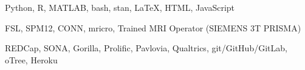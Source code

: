 	{Python, R, MATLAB, bash, stan, \LaTeX, HTML, JavaScript}

	{FSL, SPM12, CONN, mricro, Trained MRI Operator (SIEMENS 3T PRISMA)}

	{REDCap, SONA, Gorilla, Prolific, Pavlovia, Qualtrics, git/GitHub/GitLab, oTree, Heroku}
